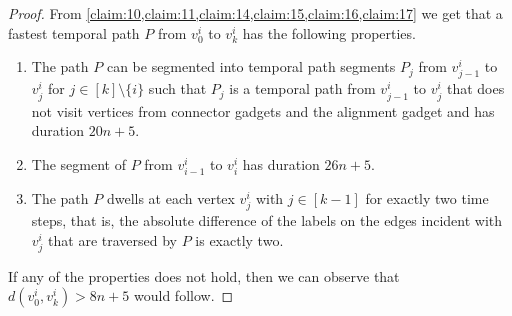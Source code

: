 \documentclass[a4paper,UKenglish,cleveref, autoref, thm-restate, anonymous]{lipics-v2021}
\begin{document}
\begin{proof}
From \cref{claim:10,claim:11,claim:14,claim:15,claim:16,claim:17} we get that a fastest temporal path $P$ from $v^i_0$ to $v^i_k$ has the following properties.
\begin{enumerate}
    \item The path $P$ can be segmented into temporal path segments $P_j$ from $v^i_{j-1}$ to $v^i_j$ for $j\in[k]\setminus\{i\}$ such that $P_j$ is a temporal path from $v^i_{j-1}$ to $v^i_j$ that does not visit vertices from connector gadgets and the alignment gadget and has duration $20n+5$.
    \item The segment of $P$ from $v^i_{i-1}$ to $v^i_i$ has duration $26n+5$.
    \item The path $P$ dwells at each vertex $v^i_j$ with $j\in[k-1]$ for exactly two time steps, that is, the absolute difference of the labels on the edges incident with $v^i_j$ that are traversed by $P$ is exactly two.
\end{enumerate}
If any of the properties does not hold, then we can observe that $d(v^i_0,v^i_k)>8n+5$ would follow.


\end{proof}
\end{document}
